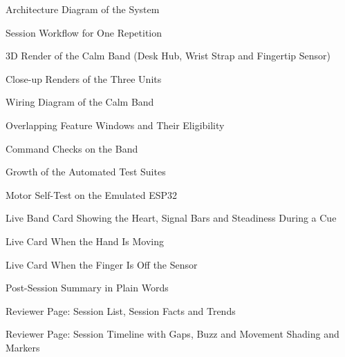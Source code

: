 \documentclass[12pt,letterpaper,oneside]{report}
\begin{document}
{\small{}
\noindent\makebox[0.09\linewidth][l]{\ref{fig:diag_arch}}Architecture Diagram of the System\dotfill\pageref{fig:diag_arch}\par
\noindent\makebox[0.09\linewidth][l]{\ref{fig:diag_seq}}Session Workflow for One Repetition\dotfill\pageref{fig:diag_seq}\par
\noindent\makebox[0.09\linewidth][l]{\ref{fig:render_hero}}3D Render of the Calm Band (Desk Hub, Wrist Strap and Fingertip Sensor)\dotfill\pageref{fig:render_hero}\par
\noindent\makebox[0.09\linewidth][l]{\ref{fig:render_closeups}}Close-up Renders of the Three Units\dotfill\pageref{fig:render_closeups}\par
\noindent\makebox[0.09\linewidth][l]{\ref{fig:wiring}}Wiring Diagram of the Calm Band\dotfill\pageref{fig:wiring}\par
\noindent\makebox[0.09\linewidth][l]{\ref{fig:chart_windows}}Overlapping Feature Windows and Their Eligibility\dotfill\pageref{fig:chart_windows}\par
\noindent\makebox[0.09\linewidth][l]{\ref{fig:diag_gate}}Command Checks on the Band\dotfill\pageref{fig:diag_gate}\par
\noindent\makebox[0.09\linewidth][l]{\ref{fig:chart_tests}}Growth of the Automated Test Suites\dotfill\pageref{fig:chart_tests}\par
\noindent\makebox[0.09\linewidth][l]{\ref{fig:chart_selftest}}Motor Self-Test on the Emulated ESP32\dotfill\pageref{fig:chart_selftest}\par
\noindent\makebox[0.09\linewidth][l]{\ref{fig:ui_live_cue}}Live Band Card Showing the Heart, Signal Bars and Steadiness During a Cue\dotfill\pageref{fig:ui_live_cue}\par
\noindent\makebox[0.09\linewidth][l]{\ref{fig:ui_live_moving}}Live Card When the Hand Is Moving\dotfill\pageref{fig:ui_live_moving}\par
\noindent\makebox[0.09\linewidth][l]{\ref{fig:ui_live_contact}}Live Card When the Finger Is Off the Sensor\dotfill\pageref{fig:ui_live_contact}\par
\noindent\makebox[0.09\linewidth][l]{\ref{fig:ui_summary}}Post-Session Summary in Plain Words\dotfill\pageref{fig:ui_summary}\par
\noindent\makebox[0.09\linewidth][l]{\ref{fig:rev_list}}Reviewer Page: Session List, Session Facts and Trends\dotfill\pageref{fig:rev_list}\par
\noindent\makebox[0.09\linewidth][l]{\ref{fig:rev_timeline}}Reviewer Page: Session Timeline with Gaps, Buzz and Movement Shading and Markers\dotfill\pageref{fig:rev_timeline}\par
}
\end{document}
